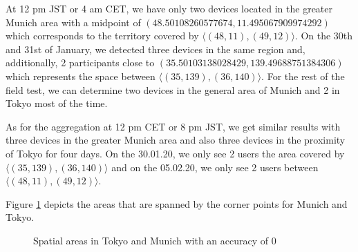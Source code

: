 At 12 pm JST or 4 am CET, we have only two devices located in the greater Munich area with a midpoint of \((48.50108260577674, 11.495067909974292)\) which corresponds to the territory covered by \(\langle(48, 11),(49, 12)\rangle\). On the 30th and 31st of January, we detected three devices in the same region and, additionally, 2 participants close to \((35.50103138028429, 139.49688751384306)\) which represents the space between \(\langle(35, 139),(36, 140)\rangle\). For the rest of the field test, we can determine two devices in the general area of Munich and 2 in Tokyo most of the time.

As for the aggregation at 12 pm CET or 8 pm JST, we get similar results with three devices in the greater Munich area and also three devices in the proximity of Tokyo for four days. On the 30.01.20, we only see 2 users the area covered by \(\langle(35, 139),(36, 140)\rangle\) and on the 05.02.20, we only see 2 users between \(\langle(48, 11),(49, 12)\rangle\).

Figure \ref{fig:acc0} depicts the areas that are spanned by the corner points for Munich and Tokyo. 

\begin{figure}[htbp]
  \centering
  \hfill
  \caption{Spatial areas in Tokyo and Munich with an accuracy of 0}
  \label{fig:acc0}
\end{figure}


